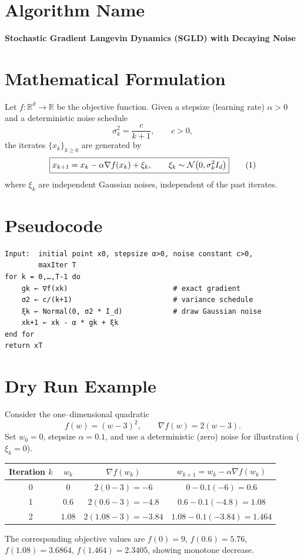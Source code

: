 \documentclass[11pt]{article}
\begin{document}
\section*{Algorithm Name}
\textbf{Stochastic Gradient Langevin Dynamics (SGLD) with Decaying Noise}

\section*{Mathematical Formulation}
Let $f:\mathbb{R}^{d}\rightarrow\mathbb{R}$ be the objective function.  
Given a stepsize (learning rate) $\alpha>0$ and a deterministic noise schedule
\[
\sigma_k^2 = \frac{c}{k+1},\qquad c>0,
\]
the iterates $\{x_k\}_{k\ge 0}$ are generated by
\begin{equation}
\boxed{%
x_{k+1}=x_k-\alpha \nabla f(x_k)+\xi_k, \qquad 
\xi_k\sim\mathcal N\bigl(0,\sigma_k^{2} I_d\bigr) }   \tag{1}
\end{equation}
where $\xi_k$ are independent Gaussian noises, independent of the past iterates.

\section*{Pseudocode}
\begin{verbatim}
Input:  initial point x0, stepsize α>0, noise constant c>0,
        maxIter T
for k = 0,…,T-1 do
    gk ← ∇f(xk)                         # exact gradient
    σ2 ← c/(k+1)                        # variance schedule
    ξk ← Normal(0, σ2 * I_d)            # draw Gaussian noise
    xk+1 ← xk - α * gk + ξk
end for
return xT
\end{verbatim}

\section*{Dry Run Example}
Consider the one–dimensional quadratic
\[
f(w)=(w-3)^2,\qquad \nabla f(w)=2(w-3).
\]
Set $w_0=0$, stepsize $\alpha=0.1$, and use a deterministic (zero) noise for illustration
($\xi_k=0$).  

\begin{center}
\begin{tabular}{c|c|c|c}
Iteration $k$ & $w_k$ & $\nabla f(w_k)$ & $w_{k+1}=w_k-\alpha\nabla f(w_k)$\\ \hline
0 & $0$ & $2(0-3)=-6$ & $0-0.1(-6)=0.6$\\
1 & $0.6$ & $2(0.6-3)=-4.8$ & $0.6-0.1(-4.8)=1.08$\\
2 & $1.08$ & $2(1.08-3)=-3.84$ & $1.08-0.1(-3.84)=1.464$\\
\end{tabular}
\end{center}
The corresponding objective values are $f(0)=9$, $f(0.6)=5.76$, $f(1.08)=3.6864$, $f(1.464)=2.3405$,
showing monotone decrease.
\end{document}
